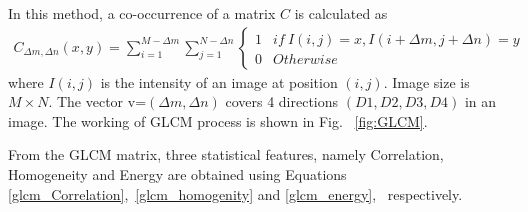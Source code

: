 In this method, a co-occurrence of a matrix $C$ is calculated as
\begin{equation}\label{glcm}
	\begin{split}
		C_{\Delta m,\Delta n}(x,y)=\sum_{i=1}^{M-\Delta m}\sum_{j=1}^{N-\Delta n}\left\{\begin{matrix}
			1 & if~I(i,j)= x, I(i+\Delta m, j+\Delta n)= y \\
			0 & Otherwise
		\end{matrix}\right.
	\end{split}
\end{equation}
where $I(i,j)$ is the intensity of an image at position $(i,j)$. Image size is
$M \times N $. The vector v=$(\Delta m, \Delta n)$ covers 4 directions $(D1, D2,
	D3, D4)$ in an image. The working of GLCM process is shown in Fig.
~\ref{fig:GLCM}.

From the GLCM matrix, three statistical features, namely Correlation,
Homogeneity and Energy are obtained using Equations
\ref{glcm_Correlation},~\ref{glcm_homogenity} and \ref{glcm_energy},
~respectively.

